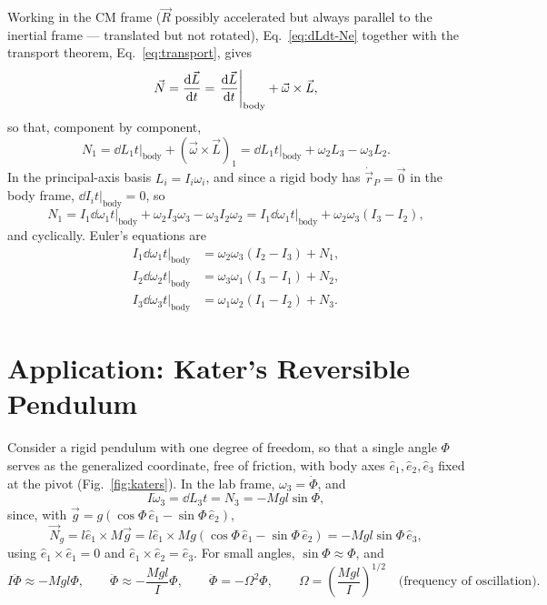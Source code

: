 \documentclass[11pt]{article}
\newcommand{\Om}{\Omega}
\begin{document}
Working in the CM frame ($\vec R$ possibly accelerated but always parallel to the inertial frame — translated but not rotated), Eq.~\eqref{eq:dLdt-Ne} together with the transport theorem, Eq.~\eqref{eq:transport}, gives
\begin{equation}
\vec N = \frac{\mathrm{d} \vec L}{\mathrm{d} t} = \left.\frac{\mathrm{d} \vec L}{\mathrm{d} t}\right|_{\mathrm{body}}+\vec\omega\times\vec L,
\label{eq:N-transport}
\end{equation}
so that, component by component,
\begin{equation}
N_1 = \left.\dd{L_1}{t}\right|_{\mathrm{body}}+(\vec\omega\times\vec L)_1 = \left.\dd{L_1}{t}\right|_{\mathrm{body}}+\omega_2L_3-\omega_3L_2.
\label{eq:N1}
\end{equation}
In the principal-axis basis $L_i=I_i\omega_i$, and since a rigid body has $\dot{\vec r}_P=\vec 0$ in the body frame, $\dd{I_i}{t}\Big|_{\mathrm{body}}=0$, so
\begin{equation}
N_1 = I_1\left.\dd{\omega_1}{t}\right|_{\mathrm{body}}+\omega_2I_3\omega_3-\omega_3I_2\omega_2 = I_1\left.\dd{\omega_1}{t}\right|_{\mathrm{body}}+\omega_2\omega_3(I_3-I_2),
\label{eq:N1-final}
\end{equation}
and cyclically. Euler's equations are
\begin{equation}
\boxed{\begin{aligned}
I_1\left.\dd{\omega_1}{t}\right|_{\mathrm{body}} &= \omega_2\omega_3(I_2-I_3)+N_1,\\
I_2\left.\dd{\omega_2}{t}\right|_{\mathrm{body}} &= \omega_3\omega_1(I_3-I_1)+N_2,\\
I_3\left.\dd{\omega_3}{t}\right|_{\mathrm{body}} &= \omega_1\omega_2(I_1-I_2)+N_3.
\end{aligned}}
\label{eq:euler-eqns}
\end{equation}

\section{Application: Kater's Reversible Pendulum}

Consider a rigid pendulum with one degree of freedom, so that a single angle $\Phi$ serves as the generalized coordinate, free of friction, with body axes $\hat e_1,\hat e_2,\hat e_3$ fixed at the pivot (Fig.~\ref{fig:katers}). In the lab frame, $\omega_3=\dot\Phi$, and
\begin{equation}
I\dot\omega_3 = \dd{L_3}{t} = N_3 = -Mgl\sin\Phi,
\label{eq:kater-N3}
\end{equation}
since, with $\vec g=g(\cos\Phi\,\hat e_1-\sin\Phi\,\hat e_2)$,
\begin{equation}
\vec N_g = l\hat e_1\times M\vec g = l\hat e_1\times Mg(\cos\Phi\,\hat e_1-\sin\Phi\,\hat e_2) = -Mgl\sin\Phi\,\hat e_3,
\label{eq:kater-torque}
\end{equation}
using $\hat e_1\times\hat e_1=0$ and $\hat e_1\times\hat e_2=\hat e_3$. For small angles, $\sin\Phi\approx\Phi$, and
\begin{equation}
I\ddot\Phi \approx -Mgl\Phi, \qquad \ddot\Phi\approx-\frac{Mgl}{I}\Phi, \qquad \ddot\Phi=-\Om^2\Phi, \qquad \Om=\left(\frac{Mgl}{I}\right)^{1/2} \quad \text{(frequency of oscillation).}
\label{eq:kater-freq}
\end{equation}
\end{document}
